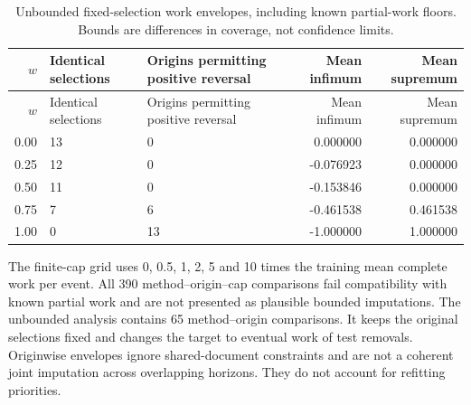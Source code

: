 \begin{small}

\setlength{\tabcolsep}{4pt}

\begin{longtable}{rp{2.4cm}p{3.6cm}rr}

\caption{Unbounded fixed-selection work envelopes, including known partial-work floors. Bounds are differences in coverage, not confidence limits.}\label{tab:s-missing-work}\\

\toprule

$w$ & Identical selections & Origins permitting positive reversal & Mean infimum & Mean supremum \\

\midrule

\endfirsthead

\toprule

$w$ & Identical selections & Origins permitting positive reversal & Mean infimum & Mean supremum \\

\midrule

\endhead

0.00 & 13 & 0 & 0.000000 & 0.000000 \\

0.25 & 12 & 0 & -0.076923 & 0.000000 \\

0.50 & 11 & 0 & -0.153846 & 0.000000 \\

0.75 & 7 & 6 & -0.461538 & 0.461538 \\

1.00 & 0 & 13 & -1.000000 & 1.000000 \\

\bottomrule

\end{longtable}

\end{small}

The finite-cap grid uses 0, 0.5, 1, 2, 5 and 10 times the training mean complete work per event. All 390 method--origin--cap comparisons fail compatibility with known partial work and are not presented as plausible bounded imputations. The unbounded analysis contains 65 method--origin comparisons. It keeps the original selections fixed and changes the target to eventual work of test removals. Originwise envelopes ignore shared-document constraints and are not a coherent joint imputation across overlapping horizons. They do not account for refitting priorities.

